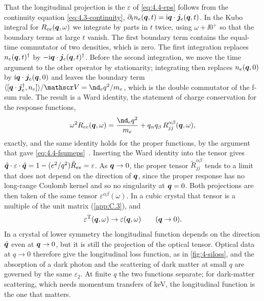 That the longitudinal projection is the $\varepsilon$ of \cref{eq:4.4-eps} follows from the continuity equation \cref{eq:4.3-continuity}, $\partial_tn_e(\bm{q},t) = \mathrm{i}\bm{q}\cdot\bm{j}_e(\bm{q},t)$. In the Kubo integral for $R_{ee}(\bm{q},\omega)$ we integrate by parts in $t$ twice, using $\omega + \ii0^+$ so that the boundary terms at large $t$ vanish. The first boundary term contains the equal-time commutator of two densities, which is zero. The first integration replaces $n_e(\bm{q},t)^\dagger$ by $-\mathrm{i}\bm{q}\cdot\bm{j}_e(\bm{q},t)^\dagger$. Before the second integration, we move the time argument to the other operator by stationarity; integrating then replaces $n_e(\bm{q},0)$ by $\mathrm{i}\bm{q}\cdot\bm{j}_e(\bm{q},0)$ and leaves the boundary term $\langle[\vect{q}\cdot\vect{j}_e^\dagger, n_e]\rangle/\Vol = \nd_eq^2/m_e$, which is the double commutator of the f-sum rule. The result is a Ward identity, the statement of charge conservation for the response functions,
\begin{equation}
  \omega^2R_{ee}(\vect{q},\omega) = \frac{\nd_eq^2}{m_e} + q_\alpha q_\beta\,R^{\alpha\beta}_{jj}(\vect{q},\omega) ,
  \label{eq:4.4-ward}
\end{equation}
exactly, and the same identity holds for the proper functions, by the argument that gave \cref{eq:4.4-fsumeps}~\cite[Chap.~3]{giuliani2005quantum}. Inserting the Ward identity into the tensor gives $\hat{\bm{q}}\cdot\varepsilon\cdot\hat{\bm{q}} = 1 - (e^2/q^2)\tilde R_{ee} = \varepsilon$. As $\bm{q} \to 0$, the proper tensor $\tilde R_{jj}^{\alpha\beta}$ tends to a limit that does not depend on the direction of $\bm{q}$, since the proper response has no long-range Coulomb kernel and so no singularity at $\bm{q} = 0$. Both projections are then taken of the same tensor $\varepsilon^{\alpha\beta}(\omega)$. In a cubic crystal that tensor is a multiple of the unit matrix (\cref{app:C.3}), and
\begin{equation}
  \varepsilon^{\mathrm{T}}(\bm{q},\omega) \to \varepsilon(\bm{q},\omega) \qquad (\bm{q} \to 0) .
  \label{eq:4.4-ET}
\end{equation}
In a crystal of lower symmetry the longitudinal function depends on the direction $\hat{\bm{q}}$ even at $\bm{q} \to 0$, but it is still the projection of the optical tensor. Optical data at $q \to 0$ therefore give the longitudinal loss function, as in \cref{fig:4-siloss}, and the absorption of a dark photon and the scattering of dark matter at small $q$ are governed by the same $\varepsilon_2$. At finite $q$ the two functions separate; for dark-matter scattering, which needs momentum transfers of keV, the longitudinal function is the one that matters.

